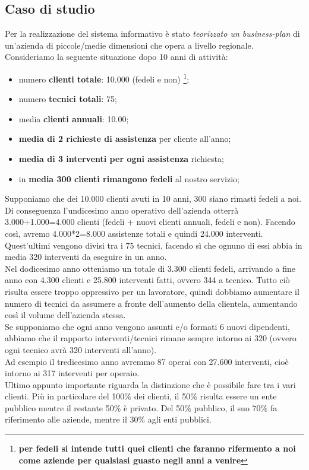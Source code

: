 \documentclass[legalpaper]{article}
\begin{document}
\subsection{Caso di studio} 
	Per la realizzazione del sistema informativo è stato \textit{teorizzato un business-plan} di un'azienda di piccole/medie dimensioni che opera a livello regionale.
	Consideriamo la seguente situazione dopo 10 anni di attività:
	\begin{itemize}
		\item numero \textbf{clienti totale}: 10.000 (fedeli e non) \footnote[1]{\textbf{per fedeli si intende tutti quei clienti che faranno rifermento a noi come aziende per qualsiasi guasto negli anni a venire}};
		\item numero \textbf{tecnici totali}: 75;
		\item media \textbf{clienti annuali}: 10.00;
		\item \textbf{media di 2 richieste di assistenza} per cliente all'anno;
		\item \textbf{media di 3 interventi per ogni assistenza} richiesta;
		\item in \textbf{media 300 clienti rimangono fedeli} al nostro servizio;
	\end{itemize}
	Supponiamo che dei 10.000 clienti avuti in 10 anni, 300 siano rimasti fedeli a noi. Di conseguenza l'undicesimo anno operativo dell'azienda otterrà 3.000+1.000=4.000 clienti (fedeli + nuovi clienti annuali, fedeli e non). Facendo così, avremo 4.000*2=8.000 assistenze totali e quindi 24.000 interventi.\\
	Quest'ultimi vengono divisi tra i 75 tecnici, facendo sì che ognuno di essi abbia in media 320 interventi da eseguire in un anno.\\
	Nel dodicesimo anno otteniamo un totale di 3.300 clienti fedeli, arrivando a fine anno con 4.300 clienti e 25.800 interventi fatti, ovvero 344 a tecnico. Tutto ciò risulta essere troppo oppressivo per un lavoratore, quindi dobbiamo aumentare il numero di tecnici da assumere a fronte dell'aumento della clientela, aumentando così il volume dell'azienda stessa.\\
	Se supponiamo che ogni anno vengono assunti e/o formati 6 nuovi dipendenti, abbiamo che il rapporto interventi/tecnici rimane sempre intorno ai 320 (ovvero ogni tecnico avrà 320 interventi all'anno).\\
	Ad esempio il tredicesimo anno avremmo 87 operai con 27.600 interventi, cioè intorno ai 317 interventi per operaio.\\
	Ultimo appunto importante riguarda la distinzione che è possibile fare tra i vari clienti.
	Più in particolare del 100\% dei clienti, il 50\% risulta essere un ente pubblico mentre il restante 50\% è privato. Del 50\% pubblico, il suo 70\% fa riferimento alle aziende, mentre il 30\% agli enti pubblici.
	
\end{document}
